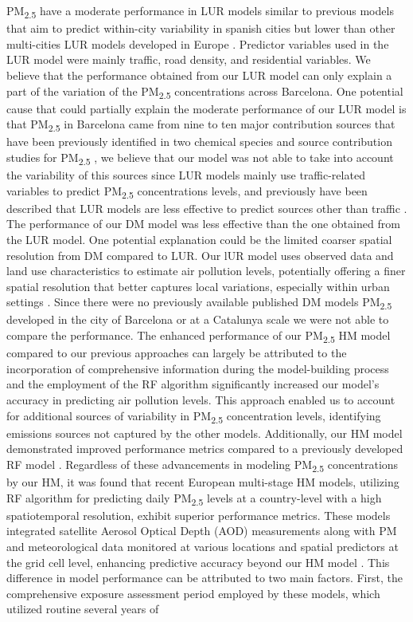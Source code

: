 \documentclass{article}
\begin{document}
PM\textsubscript{2.5} have a moderate performance in LUR models similar to  previous models that aim to predict within-city variability in spanish cities \cite{rivera2012, wang2014} but lower than other multi-cities LUR models developed in Europe \cite{eeftens2012, gulliver2018}. Predictor variables used in the LUR model were mainly traffic, road density, and residential variables. We believe that the performance obtained from our LUR model can only explain a part of the variation of the  PM\textsubscript{2.5} concentrations across Barcelona. One potential cause that could partially explain the moderate performance of our LUR model is that PM\textsubscript{2.5} in Barcelona came from nine to ten major contribution sources that have been previously identified in two chemical species and source contribution studies for PM\textsubscript{2.5} \cite{in2021, amato2024}, we believe that our model was not able to take into account the variability of this sources since LUR models mainly use traffic-related variables to predict PM\textsubscript{2.5} concentrations levels, and previously have been described that LUR models are less effective to predict sources other than traffic \cite{dehoogh2014}. The performance of our DM model was less effective than the one obtained from the LUR model. One potential explanation could be the limited coarser spatial resolution from DM compared to LUR. Our lUR model uses observed data and land use characteristics to estimate air pollution levels, potentially offering a finer spatial resolution that better captures local variations, especially within urban settings \cite{hoek2017}. Since there were no previously available published DM models PM\textsubscript{2.5} developed in the city of Barcelona or at a Catalunya scale we were not able to compare the performance. The enhanced performance of our PM\textsubscript{2.5} HM model compared to our previous approaches can largely be attributed to the incorporation of comprehensive information during the model-building process and  the employment of the RF algorithm significantly increased our model's accuracy in predicting air pollution levels. This approach enabled us to account for additional sources of variability in PM\textsubscript{2.5} concentration levels, identifying emissions sources not captured by the other models. Additionally, our HM model demonstrated improved performance metrics compared to a previously developed RF model \cite{mila2023}. Regardless of these advancements in modeling PM\textsubscript{2.5} concentrations by our HM, it was found that recent European multi-stage HM models, utilizing RF algorithm for predicting daily PM\textsubscript{2.5} levels at a country-level with a high spatiotemporal resolution, exhibit superior performance metrics. These models integrated satellite Aerosol Optical Depth (AOD) measurements along with PM and meteorological data monitored at various locations and spatial predictors at the grid cell level, enhancing predictive accuracy beyond our HM model \cite{dehoogh2018, stafoggia2019, stafoggia2020, schneider2020}. This difference in model performance can be attributed to two main factors. First, the comprehensive exposure assessment period employed by these models, which utilized routine several years of 
\end{document}
